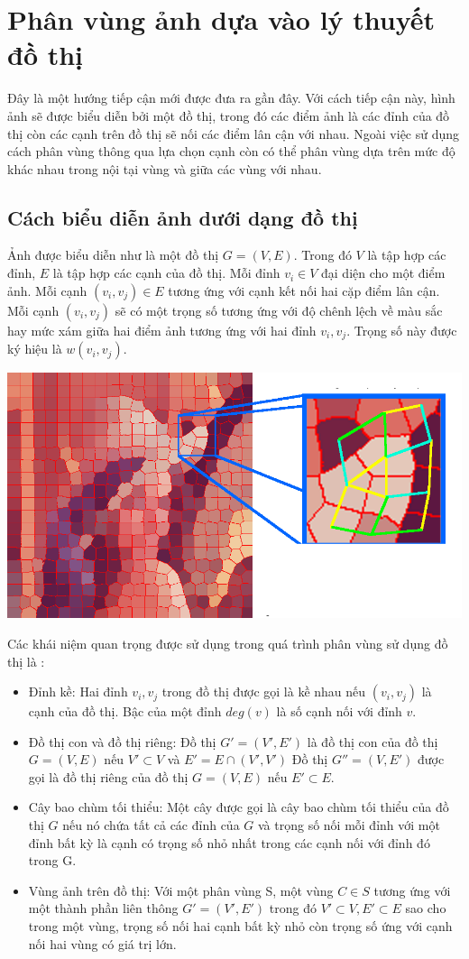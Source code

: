 \documentclass[12pt, oneside, a4]{book}
\begin{document}
\section{Phân vùng ảnh dựa vào lý thuyết đồ thị}
Đây là một hướng tiếp cận mới được đưa ra gần đây. Với cách tiếp cận này, hình ảnh sẽ được biểu diễn bởi một đồ thị, trong đó các điểm ảnh là các đỉnh của đồ thị còn các cạnh trên đồ thị sẽ nối các điểm lân cận với nhau. Ngoài việc sử dụng cách phân vùng thông qua lựa chọn cạnh còn có thể phân vùng dựa trên mức độ khác nhau trong nội tại vùng và giữa các vùng với nhau.
\subsection{Cách biểu diễn ảnh dưới dạng đồ thị}
Ảnh được biểu diễn như là một đồ thị $G=(V,E)$. Trong đó $V$ là tập hợp các đỉnh, $E$ là tập hợp các cạnh của đồ thị. Mỗi đỉnh $v_i\in V$ đại diện cho một điểm ảnh. Mỗi cạnh $(v_i,v_j)\in E$ tương ứng với cạnh kết nối hai cặp điểm lân cận. Mỗi cạnh $(v_i,v_j)$ sẽ có một trọng số tương ứng với độ chênh lệch về màu sắc hay mức xám giữa hai điểm ảnh tương ứng với hai đỉnh $v_i, v_j $. Trọng số này được ký hiệu là $w(v_i, v_j)$.
\begin{center}
\includegraphics[scale=0.3]{figure/graphbased.png}
\end{center}
Các khái niệm quan trọng được sử dụng trong quá trình phân vùng sử dụng đồ thị là :
\begin{itemize}
\item Đỉnh kề: Hai đỉnh $v_i, v_j$ trong đồ thị được gọi là kề nhau nếu $(v_i,v_j)$ là cạnh của đồ thị. Bậc của một đỉnh $deg(v)$ là số cạnh nối với đỉnh $v$.
\item Đồ thị con và đồ thị riêng:
Đồ thị $G'=(V',E')$ là đồ thị con của đồ thị $G=(V,E)$ nếu $V' \subset V$ và $E'=E\cap (V',V')$ 
Đồ thị  $G''=(V,E')$ được gọi là đồ thị riêng của đồ thị $G=(V,E)$ nếu $E'\subset E$.
\item Cây bao chùm tối thiểu: Một cây được gọi là cây bao chùm tối thiểu của đồ thị $G$  nếu nó chứa tất cả các đỉnh của $G$ và trọng số nối mỗi đỉnh với một đỉnh bất kỳ là cạnh có trọng số nhỏ nhất trong các cạnh nối với đỉnh đó trong G. 
\item Vùng ảnh trên đồ thị: Với một phân vùng S, một vùng $C\in S$ tương ứng với một thành phần liên thông $G'=(V', E')$ trong đó  $V'\subset V, E' \subset E$ sao cho trong một vùng, trọng số nối hai cạnh bất kỳ nhỏ còn trọng số ứng với cạnh nối hai vùng có giá trị lớn.
\end{itemize}
\end{document}
